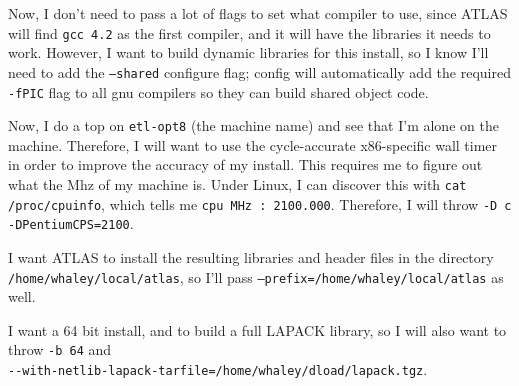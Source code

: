 \documentclass[11pt]{article}
\begin{document}
Now, I don't need to pass a lot of flags to set what compiler to use,
since ATLAS will find {\tt gcc 4.2} as the first compiler, and it will
have the libraries it needs to work.  However, I want to build dynamic
libraries for this install, so I know I'll need to add the 
{\tt --shared} configure flag; config will automatically add the required
{\tt -fPIC} flag to all gnu compilers so they can build shared object code.

Now, I do a top on {\tt etl-opt8} (the machine name) and see that
I'm alone on the machine.  Therefore, I will want to
use the cycle-accurate x86-specific wall timer in order to improve the
accuracy of my install.  This requires me to figure out what the Mhz of
my machine is.
Under Linux, I can discover this with {\tt cat /proc/cpuinfo}, which tells
me {\tt cpu~MHz~:~2100.000}.  Therefore, I will throw
{\tt -D c -DPentiumCPS=2100}.

I want ATLAS to install the resulting libraries and header files in
the directory \\
{\tt /home/whaley/local/atlas}, so I'll pass
{\tt --prefix=/home/whaley/local/atlas} as well.

I want a 64 bit install, and to build a full LAPACK library, so I will also
want to throw {\tt -b 64} and \\
\verb|--with-netlib-lapack-tarfile=/home/whaley/dload/lapack.tgz|.
\end{document}
